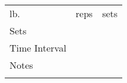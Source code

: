 
{\setlength{\extrarowheight}{10pt}%
    \begin{tabularx}{\textwidth}{ 
      | >{\raggedleft\arraybackslash}X 
      | >{\raggedleft\arraybackslash}X 
      | >{\raggedleft\arraybackslash}X | }
        \hline
        \multicolumn{3}{|X|}{\VAR{name}} \\
        \hline
        lb. & reps &  sets \\
        \hline
        Sets & \multicolumn{2}{|X|}{ } \\
        \hline
        Time Interval & \multicolumn{2}{|X|}{ } \\
        \hline
        Notes & \multicolumn{2}{c|}{} \\
              & \multicolumn{2}{c|}{} \\
        \hline
    \end{tabularx}}
\vspace{0.25cm}
